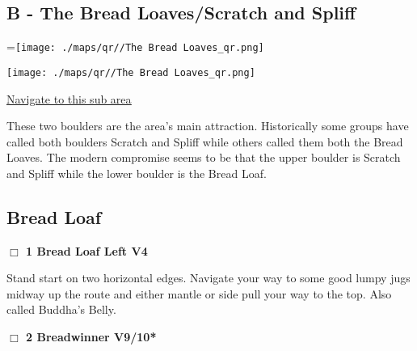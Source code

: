 	\begin{multicols}{2}

\section{B - The Bread Loaves/Scratch and Spliff}\label{sa:The Bread Loaves}
=\hbox{\texttt{[image: ./maps/qr//The Bread Loaves\_qr.png]}}%
\begin{center}
\texttt{[image: ./maps/qr//The Bread Loaves\_qr.png]}
\end{center}
\begin{center}
\underline{\textcolor{blue}{\href{http://maps.google.com/maps?q=44.43968787057463,-122.58169628966748}{Navigate to this sub area}}}
\end{center}


These two boulders are the area's main attraction. Historically some groups have called both boulders Scratch and Spliff while others called them both the Bread Loaves. The modern compromise seems to be that the upper boulder is Scratch and Spliff while the lower boulder is the Bread Loaf.\\




\needspace{10em}
\subsection*{Bread Loaf}\label{bf:Bread Loaf}




\needspace{2em}
\label{rt:Bread Loaf Left}
\colorbox{RoyalBlue!20}{
\parbox{0.95\linewidth}{
\hspace{-1ex}\textbf{$\Box$
1 Bread Loaf Left V4  
}}}
\begin{adjustwidth}{1.3em}{}			

Stand start on two horizontal edges. Navigate your way to some good lumpy jugs midway up the route and either mantle or side pull your way to the top. Also called Buddha's Belly.
\end{adjustwidth}




\needspace{2em}
\label{rt:Breadwinner}
\colorbox{red!20}{
\parbox{0.95\linewidth}{
\hspace{-1ex}\textbf{$\Box$
2 Breadwinner V9/10*  
}}}
\begin{adjustwidth}{1.3em}{}			


\end{adjustwidth}
\end{multicols}

